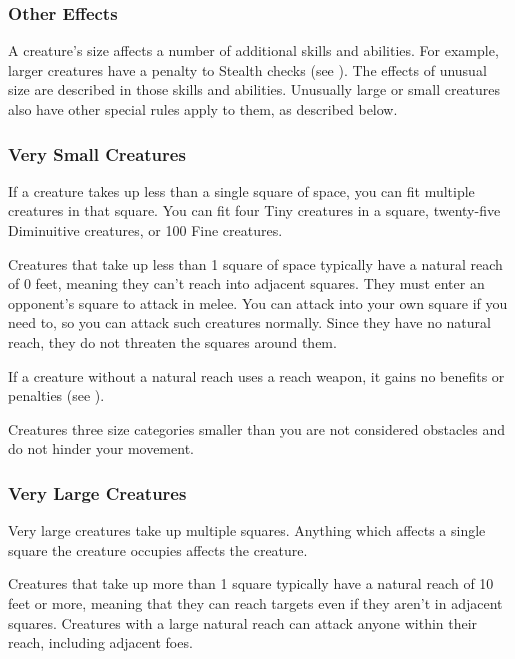         \subsubsection{Other Effects}
            A creature's size affects a number of additional skills and abilities.
            For example, larger creatures have a penalty to Stealth checks (see ).
            The effects of unusual size are described in those skills and abilities.
            Unusually large or small creatures also have other special rules apply to them, as described below.

        \subsubsection{Very Small Creatures}
             If a creature takes up less than a single square of space, you can fit multiple creatures in that square. You can fit four Tiny creatures in a square, twenty-five Diminuitive creatures, or 100 Fine creatures.

             Creatures that take up less than 1 square of space typically have a natural reach of 0 feet, meaning they can't reach into adjacent squares. They must enter an opponent's square to attack in melee. You can attack into your own square if you need to, so you can attack such creatures normally. Since they have no natural reach, they do not threaten the squares around them.

            If a creature without a natural reach uses a reach weapon, it gains no benefits or penalties (see ).

             Creatures three size categories smaller than you are not considered obstacles and do not hinder your movement.

        \subsubsection{Very Large Creatures}
             Very large creatures take up multiple squares. Anything which affects a single square the creature occupies affects the creature.

             Creatures that take up more than 1 square typically have a natural reach of 10 feet or more, meaning that they can reach targets even if they aren't in adjacent squares. Creatures with a large natural reach can attack anyone within their reach, including adjacent foes.

